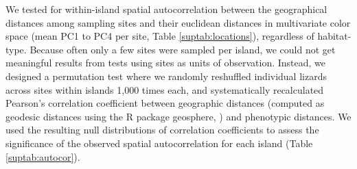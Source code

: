 We tested for within-island spatial autocorrelation between the geographical distances among sampling sites and their euclidean distances in multivariate color space (mean PC1 to PC4 per site, Table \ref{suptab:locations}), regardless of habitat-type. Because often only a few sites were sampled per island, we could not get meaningful results from tests using sites as units of observation. Instead, we designed a permutation test where we randomly reshuffled individual lizards across sites within islands 1,000 times each, and systematically recalculated Pearson's correlation coefficient between geographic distances (computed as geodesic distances using the R package geosphere, \citealt{Hijmans2019}) and phenotypic distances. We used the resulting null distributions of correlation coefficients to assess the significance of the observed spatial autocorrelation for each island (Table \ref{suptab:autocor}).

